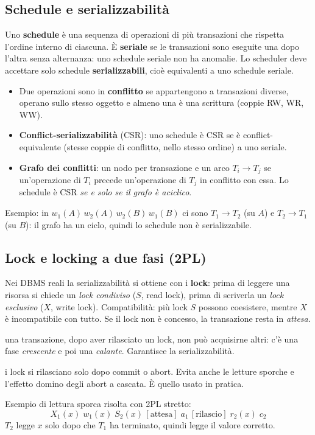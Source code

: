 \documentclass[a4paper,12pt]{article}
\begin{document}
\subsection{Schedule e serializzabilità}

Uno \textbf{schedule} è una sequenza di operazioni di più transazioni che
rispetta l'ordine interno di ciascuna. È \textbf{seriale} se le transazioni
sono eseguite una dopo l'altra senza alternanza: uno schedule seriale non ha
anomalie. Lo scheduler deve accettare solo schedule \textbf{serializzabili},
cioè equivalenti a uno schedule seriale.
\begin{itemize}
  \item Due operazioni sono in \textbf{conflitto} se appartengono a transazioni
    diverse, operano sullo stesso oggetto e almeno una è una scrittura (coppie
    RW, WR, WW).
  \item \textbf{Conflict-serializzabilità} (CSR): uno schedule è CSR se è
    conflict-equivalente (stesse coppie di conflitto, nello stesso ordine) a uno
    seriale.
  \item \textbf{Grafo dei conflitti}: un nodo per transazione e un arco
    $T_i \to T_j$ se un'operazione di $T_i$ precede un'operazione di $T_j$ in
    conflitto con essa. Lo schedule è CSR \emph{se e solo se il grafo è
    aciclico}.
\end{itemize}
Esempio: in $w_1(A)\,w_2(A)\,w_2(B)\,w_1(B)$ ci sono $T_1 \to T_2$ (su $A$) e
$T_2 \to T_1$ (su $B$): il grafo ha un ciclo, quindi lo schedule non è
serializzabile.

\subsection{Lock e locking a due fasi (2PL)}

Nei DBMS reali la serializzabilità si ottiene con i \textbf{lock}: prima di
leggere una risorsa si chiede un \emph{lock condiviso} ($S$, read lock), prima
di scriverla un \emph{lock esclusivo} ($X$, write lock). Compatibilità: più
lock $S$ possono coesistere, mentre $X$ è incompatibile con tutto. Se il lock
non è concesso, la transazione resta in \emph{attesa}.

\begin{description}[style=nextline]
  \item[2PL (locking a due fasi)] una transazione, dopo aver rilasciato un
    lock, non può acquisirne altri: c'è una fase \emph{crescente} e poi una
    \emph{calante}. Garantisce la serializzabilità.
  \item[2PL stretto] i lock si rilasciano solo dopo commit o abort. Evita
    anche le letture sporche e l'effetto domino degli abort a cascata. È quello
    usato in pratica.
\end{description}
Esempio di lettura sporca risolta con 2PL stretto:
\[
X_1(x)\; w_1(x)\; S_2(x)\,[\text{attesa}]\; a_1\,[\text{rilascio}]\; r_2(x)\; c_2
\]
$T_2$ legge $x$ solo dopo che $T_1$ ha terminato, quindi legge il valore
corretto.
\end{document}
